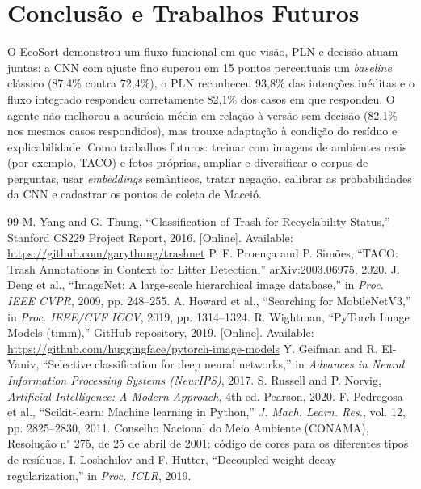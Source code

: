 \documentclass[conference]{IEEEtran}
\begin{document}
\section{Conclus\~ao e Trabalhos Futuros}
O EcoSort demonstrou um fluxo funcional em que vis\~ao, PLN e decis\~ao atuam juntas: a CNN com ajuste fino superou em 15 pontos percentuais um \emph{baseline} cl\'assico (87,4\% contra 72,4\%), o PLN reconheceu 93,8\% das inten\c{c}\~oes inéditas e o fluxo integrado respondeu corretamente 82,1\% dos casos em que respondeu. O agente n\~ao melhorou a acur\'acia m\'edia em rela\c{c}\~ao \`a vers\~ao sem decis\~ao (82,1\% nos mesmos casos respondidos), mas trouxe adapta\c{c}\~ao \`a condi\c{c}\~ao do res\'iduo e explicabilidade. Como trabalhos futuros: treinar com imagens de ambientes reais (por exemplo, TACO) e fotos pr\'oprias, ampliar e diversificar o corpus de perguntas, usar \emph{embeddings} sem\^anticos, tratar nega\c{c}\~ao, calibrar as probabilidades da CNN e cadastrar os pontos de coleta de Macei\'o.

\begin{thebibliography}{99}
 M. Yang and G. Thung, ``Classification of Trash for Recyclability Status,'' Stanford CS229 Project Report, 2016. [Online]. Available: \url{https://github.com/garythung/trashnet}
 P. F. Proen\c{c}a and P. Sim\~oes, ``TACO: Trash Annotations in Context for Litter Detection,'' arXiv:2003.06975, 2020.
 J. Deng et al., ``ImageNet: A large-scale hierarchical image database,'' in \emph{Proc. IEEE CVPR}, 2009, pp. 248--255.
 A. Howard et al., ``Searching for MobileNetV3,'' in \emph{Proc. IEEE/CVF ICCV}, 2019, pp. 1314--1324.
 R. Wightman, ``PyTorch Image Models (timm),'' GitHub repository, 2019. [Online]. Available: \url{https://github.com/huggingface/pytorch-image-models}
 Y. Geifman and R. El-Yaniv, ``Selective classification for deep neural networks,'' in \emph{Advances in Neural Information Processing Systems (NeurIPS)}, 2017.
 S. Russell and P. Norvig, \emph{Artificial Intelligence: A Modern Approach}, 4th ed. Pearson, 2020.
 F. Pedregosa et al., ``Scikit-learn: Machine learning in Python,'' \emph{J. Mach. Learn. Res.}, vol. 12, pp. 2825--2830, 2011.
 Conselho Nacional do Meio Ambiente (CONAMA), Resolu\c{c}\~ao n$^\circ$ 275, de 25 de abril de 2001: c\'odigo de cores para os diferentes tipos de res\'iduos.
 I. Loshchilov and F. Hutter, ``Decoupled weight decay regularization,'' in \emph{Proc. ICLR}, 2019.
\end{thebibliography}
\end{document}
